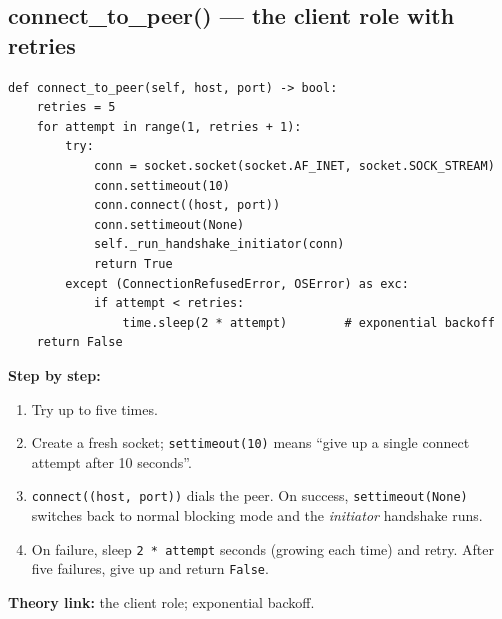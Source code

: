 \documentclass[11pt,a4paper]{report}
\begin{document}
\subsection{connect\_to\_peer() --- the client role with retries}
\begin{lstlisting}[style=py,caption={vehicle\_node.py --- connecting to a peer, with backoff.}]
def connect_to_peer(self, host, port) -> bool:
    retries = 5
    for attempt in range(1, retries + 1):
        try:
            conn = socket.socket(socket.AF_INET, socket.SOCK_STREAM)
            conn.settimeout(10)
            conn.connect((host, port))
            conn.settimeout(None)
            self._run_handshake_initiator(conn)
            return True
        except (ConnectionRefusedError, OSError) as exc:
            if attempt < retries:
                time.sleep(2 * attempt)        # exponential backoff
    return False
\end{lstlisting}
\textbf{Step by step:}
\begin{enumerate}
  \item Try up to five times.
  \item Create a fresh socket; \texttt{settimeout(10)} means ``give up a single
        connect attempt after 10 seconds''.
  \item \texttt{connect((host, port))} dials the peer. On success,
        \texttt{settimeout(None)} switches back to normal blocking mode and the
        \emph{initiator} handshake runs.
  \item On failure, sleep \texttt{2 * attempt} seconds (growing each time) and
        retry. After five failures, give up and return \texttt{False}.
\end{enumerate}
\textbf{Theory link:} the client role; exponential backoff.
\end{document}

